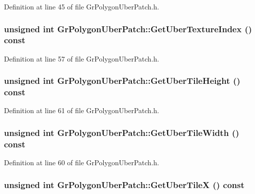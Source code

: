 Definition at line 45 of file GrPolygonUberPatch.h.\hypertarget{class_gr_polygon_uber_patch_37b7399470d8347fc40aba50ad8ff37b}{
\subsubsection[{GetUberTextureIndex}]{\setlength{\rightskip}{0pt plus 5cm}unsigned int GrPolygonUberPatch::GetUberTextureIndex () const}}
\label{class_gr_polygon_uber_patch_37b7399470d8347fc40aba50ad8ff37b}




Definition at line 57 of file GrPolygonUberPatch.h.\hypertarget{class_gr_polygon_uber_patch_7c11c389237f476236501ac915a11ff4}{
\subsubsection[{GetUberTileHeight}]{\setlength{\rightskip}{0pt plus 5cm}unsigned int GrPolygonUberPatch::GetUberTileHeight () const}}
\label{class_gr_polygon_uber_patch_7c11c389237f476236501ac915a11ff4}




Definition at line 61 of file GrPolygonUberPatch.h.\hypertarget{class_gr_polygon_uber_patch_0bde2e89a95ba150051072210821db4b}{
\subsubsection[{GetUberTileWidth}]{\setlength{\rightskip}{0pt plus 5cm}unsigned int GrPolygonUberPatch::GetUberTileWidth () const}}
\label{class_gr_polygon_uber_patch_0bde2e89a95ba150051072210821db4b}




Definition at line 60 of file GrPolygonUberPatch.h.\hypertarget{class_gr_polygon_uber_patch_8eedf03ce219677c3e5a4d720ca856a6}{
\subsubsection[{GetUberTileX}]{\setlength{\rightskip}{0pt plus 5cm}unsigned int GrPolygonUberPatch::GetUberTileX () const}}
\label{class_gr_polygon_uber_patch_8eedf03ce219677c3e5a4d720ca856a6}





